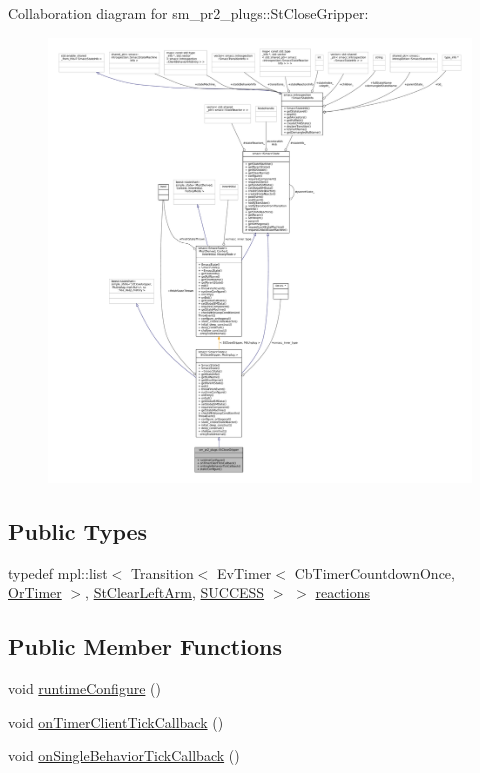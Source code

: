 Collaboration diagram for sm\+\_\+pr2\+\_\+plugs\+:\+:St\+Close\+Gripper\+:
\nopagebreak
\begin{figure}[H]
\begin{center}
\leavevmode
\includegraphics[width=350pt]{structsm__pr2__plugs_1_1StCloseGripper__coll__graph}
\end{center}
\end{figure}
\subsection*{Public Types}
\begin{DoxyCompactItemize}
\item 
typedef mpl\+::list$<$ Transition$<$ Ev\+Timer$<$ Cb\+Timer\+Countdown\+Once, \hyperlink{classsm__pr2__plugs_1_1OrTimer}{Or\+Timer} $>$, \hyperlink{structsm__pr2__plugs_1_1StClearLeftArm}{St\+Clear\+Left\+Arm}, \hyperlink{classSUCCESS}{S\+U\+C\+C\+E\+SS} $>$ $>$ \hyperlink{structsm__pr2__plugs_1_1StCloseGripper_a0ad3f271dea7b36dc6ac599b9818bb77}{reactions}
\end{DoxyCompactItemize}
\subsection*{Public Member Functions}
\begin{DoxyCompactItemize}
\item 
void \hyperlink{structsm__pr2__plugs_1_1StCloseGripper_aaad13a14b27b9e31bd14aa932c191d57}{runtime\+Configure} ()
\item 
void \hyperlink{structsm__pr2__plugs_1_1StCloseGripper_a05a1de398b611d66e20f3595c6f0f8a6}{on\+Timer\+Client\+Tick\+Callback} ()
\item 
void \hyperlink{structsm__pr2__plugs_1_1StCloseGripper_a34d9b8e32da01b35c731fbbdf3edca69}{on\+Single\+Behavior\+Tick\+Callback} ()
\end{DoxyCompactItemize}
